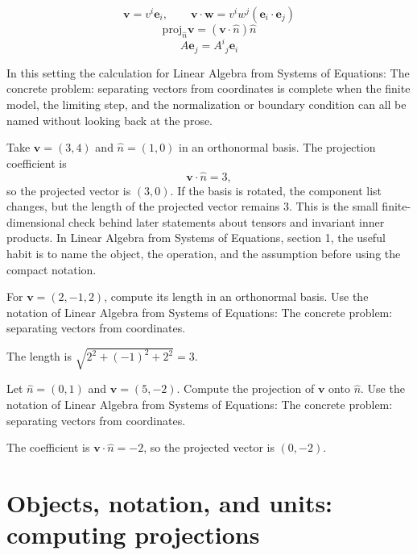 \[
  \bm v=v^i\bm e_i,\qquad \bm v\cdot\bm w=v^iw^j(\bm e_i\cdot\bm e_j)
\]
\[
  \mathrm{proj}_{\hat n}\bm v=(\bm v\cdot\hat n)\hat n
\]
\[
  A\bm e_j=A^i{}_j\bm e_i
\]

In this setting the calculation for Linear Algebra from Systems of Equations: The concrete problem: separating vectors from coordinates is complete when the finite model, the limiting step, and the normalization or boundary condition can all be named without looking back at the prose.




\begin{example}
Take \(\bm v=(3,4)\) and \(\hat n=(1,0)\) in an orthonormal basis.  The projection coefficient is
\[
  \bm v\cdot\hat n=3,
\]
so the projected vector is \((3,0)\).  If the basis is rotated, the component list changes, but the length of the projected vector remains \(3\).  This is the small finite-dimensional check behind later statements about tensors and invariant inner products.  In Linear Algebra from Systems of Equations, section 1, the useful habit is to name the object, the operation, and the assumption before using the compact notation.
\end{example}



\begin{exercise}
For \(\bm v=(2,-1,2)\), compute its length in an orthonormal basis.  Use the notation of Linear Algebra from Systems of Equations: The concrete problem: separating vectors from coordinates.
\begin{answer}
The length is \(\sqrt{2^2+(-1)^2+2^2}=3\).
\end{answer}
\end{exercise}

\begin{exercise}
Let \(\hat n=(0,1)\) and \(\bm v=(5,-2)\).  Compute the projection of \(\bm v\) onto \(\hat n\).  Use the notation of Linear Algebra from Systems of Equations: The concrete problem: separating vectors from coordinates.
\begin{answer}
The coefficient is \(\bm v\cdot\hat n=-2\), so the projected vector is \((0,-2)\).
\end{answer}
\end{exercise}



\section{Objects, notation, and units: computing projections}

